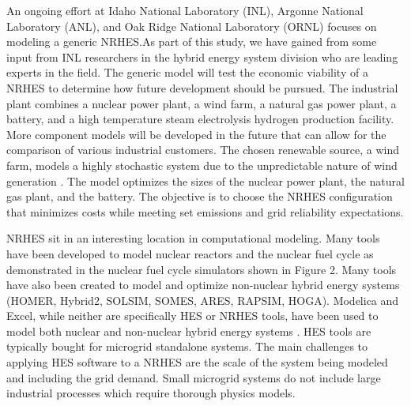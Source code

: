 \documentclass{article}                                                                           %
\begin{document}
\begin{linenumbers}
An ongoing effort at Idaho National Laboratory (INL), Argonne National Laboratory (ANL), and Oak Ridge National Laboratory (ORNL) focuses on modeling a generic NRHES.As part of this study, we have gained from some input from INL researchers in the hybrid energy system division who are leading experts in the field. The generic model will test the economic viability of a NRHES to determine how future development should be pursued. The industrial plant combines a nuclear power plant, a wind farm, a natural gas power plant, a battery, and a high temperature steam electrolysis hydrogen production facility. More component models will be developed in the future that can allow for the comparison of various industrial customers\cite{Harrison2016}. The chosen renewable source, a wind farm, models a highly stochastic system due to the unpredictable nature of wind generation \cite{Chen2016_wind}. The model optimizes the sizes of the nuclear power plant, the natural gas plant, and the battery. The objective is to choose the NRHES configuration that minimizes costs while meeting set emissions and grid reliability expectations.

NRHES sit in an interesting location in computational modeling. Many tools have been developed to model nuclear reactors and the nuclear fuel cycle as demonstrated in the nuclear fuel cycle simulators shown in Figure 2. Many tools have also been created to model and optimize non-nuclear hybrid energy systems (HOMER, Hybrid2, SOLSIM, SOMES, ARES, RAPSIM, HOGA)\cite {Bernal-Agustin2009}. Modelica and Excel, while neither are specifically HES or NRHES tools, have been used to model both nuclear and non-nuclear hybrid energy systems \cite{Shropshire2012, Chen2016, Binder2014, Garcia2015, Epiney2016}. HES tools are typically bought for microgrid standalone systems. The main challenges to applying HES software to a NRHES are the scale of the system being modeled and including the grid demand. Small microgrid systems do not include large industrial processes which require thorough physics models.


\end{linenumbers}
\end{document}
